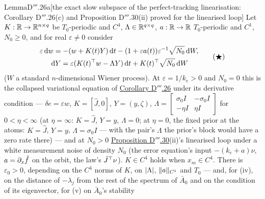 \begin{thm}{Lemma}{D$'''$.26a}[the exact slow subspace of the perfect-tracking linearisation: Corollary D$'''$.26(c)
and Proposition D$'''$.30(ii) proved for the linearised loop]\label{res:thmDppp:26a}%
Let $K:\mathbb{R}\to\mathbb{R}^{n\times q}$ be $T_0$-periodic and $C^4$, $\Lambda\in\mathbb{R}^{q\times q}$, $a:\mathbb{R}\to\mathbb{R}$ $T_0$-periodic and
$C^1$, $N_0\ge0$, and for real $\varepsilon\ne0$ consider
\begin{equation}
  \begin{gathered}
    \varepsilon\,\mathrm{d} w = -(w + K(t)Y)\,\mathrm{d} t - (1 + \varepsilon a(t))\varepsilon^{-1}\sqrt{N_0}\,\mathrm{d} W,\\
    \,\mathrm{d} Y = \varepsilon(K(t)^\top w - \Lambda Y)\,\mathrm{d} t + K(t)^\top\sqrt{N_0}\,\mathrm{d} W
  \end{gathered}
  \tag{$\bigstar$}
\end{equation}
($W$ a standard $n$-dimensional Wiener process). At $\varepsilon = 1/k_e > 0$ and $N_0 = 0$ this is the collapsed
variational equation of \hyperref[res:thmDppp:26]{Corollary D$'''$.26} under its derivative condition ---
$\delta e = \varepsilon w$, $K = [\hat J,0]$, $Y = (y,\zeta)$,
$\Lambda = \left[\begin{smallmatrix}\sigma_0I & -\sigma_0I\\ -\eta I & \eta I\end{smallmatrix}\right]$ for
$0 < \eta < \infty$ (at $\eta = \infty$: $K = \hat J$, $Y = y$, $\Lambda = 0$; at $\eta = 0$, the fixed prior at the
atoms: $K = \hat J$, $Y = y$, $\Lambda = \sigma_0I$ --- with the pair's $\Lambda$ the prior's block would have a zero
rate there) --- and at $N_0 > 0$ \hyperref[res:thmDppp:30]{Proposition D$'''$.30}(ii)'s linearised loop under a white
measurement noise of density $N_0$ (the error equation's input $-(k_e + a)\nu$, $a = \partial_x\hat f$ on the orbit,
the law's $\hat J^\top\nu$). $K\in C^4$ holds when $x_m\in C^4$. There is $\varepsilon_0 > 0$, depending on the $C^4$
norms of $K$, on $\lvert \Lambda\rvert$, $\lVert a\rVert_{C^1}$ and $T_0$ --- and, for (iv), on the distance of $-\lambda_j$ from
the rest of the spectrum of $\bar A_0$ and on the condition of its eigenvector, for (v) on $\bar A_0$'s stability

\end{thm}
